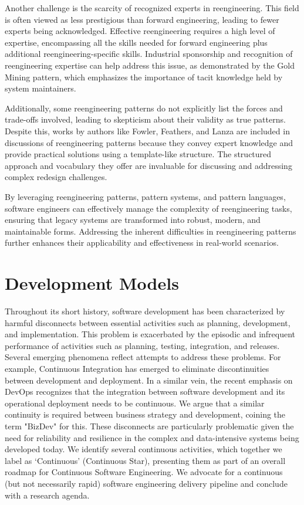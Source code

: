 Another challenge is the scarcity of recognized experts in reengineering. This field is often viewed as less prestigious than forward engineering, leading to fewer experts being acknowledged. Effective reengineering requires a high level of expertise, encompassing all the skills needed for forward engineering plus additional reengineering-specific skills. Industrial sponsorship and recognition of reengineering expertise can help address this issue, as demonstrated by the Gold Mining pattern, which emphasizes the importance of tacit knowledge held by system maintainers.

Additionally, some reengineering patterns do not explicitly list the forces and trade-offs involved, leading to skepticism about their validity as true patterns. Despite this, works by authors like Fowler, Feathers, and Lanza are included in discussions of reengineering patterns because they convey expert knowledge and provide practical solutions using a template-like structure. The structured approach and vocabulary they offer are invaluable for discussing and addressing complex redesign challenges.

By leveraging reengineering patterns, pattern systems, and pattern languages, software engineers can effectively manage the complexity of reengineering tasks, ensuring that legacy systems are transformed into robust, modern, and maintainable forms. Addressing the inherent difficulties in reengineering patterns further enhances their applicability and effectiveness in real-world scenarios.


\section{Development Models}
\cite{DevelopmentModels2010}
\cite{ContinuousEngineering2017}

Throughout its short history, software development has been characterized by harmful disconnects between essential activities such as planning, development, and implementation. This problem is exacerbated by the episodic and infrequent performance of activities such as planning, testing, integration, and releases. Several emerging phenomena reflect attempts to address these problems. For example, Continuous Integration has emerged to eliminate discontinuities between development and deployment. In a similar vein, the recent emphasis on DevOps recognizes that the integration between software development and its operational deployment needs to be continuous. We argue that a similar continuity is required between business strategy and development, coining the term "BizDev" for this. These disconnects are particularly problematic given the need for reliability and resilience in the complex and data-intensive systems being developed today. We identify several continuous activities, which together we label as ‘Continuous’ (Continuous Star), presenting them as part of an overall roadmap for Continuous Software Engineering. We advocate for a continuous (but not necessarily rapid) software engineering delivery pipeline and conclude with a research agenda.

